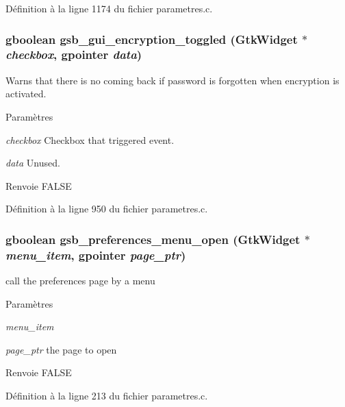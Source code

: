 Définition à la ligne 1174 du fichier parametres.c.

\subsubsection[{gsb\_\-gui\_\-encryption\_\-toggled}]{\setlength{\rightskip}{0pt plus 5cm}gboolean gsb\_\-gui\_\-encryption\_\-toggled (GtkWidget $\ast$ {\em checkbox}, \/  gpointer {\em data})}\label{parametres_8c_aeda2d150b221e3ecad4af85050194e3f}
Warns that there is no coming back if password is forgotten when encryption is activated.


\begin{DoxyParams}{Paramètres}
\item[{\em checkbox}]Checkbox that triggered event. \item[{\em data}]Unused.\end{DoxyParams}
\begin{DoxyReturn}{Renvoie}
FALSE 
\end{DoxyReturn}


Définition à la ligne 950 du fichier parametres.c.

\subsubsection[{gsb\_\-preferences\_\-menu\_\-open}]{\setlength{\rightskip}{0pt plus 5cm}gboolean gsb\_\-preferences\_\-menu\_\-open (GtkWidget $\ast$ {\em menu\_\-item}, \/  gpointer {\em page\_\-ptr})}\label{parametres_8c_a0da746576e2617f919aa2c8047ec3bf0}
call the preferences page by a menu


\begin{DoxyParams}{Paramètres}
\item[{\em menu\_\-item}]\item[{\em page\_\-ptr}]the page to open\end{DoxyParams}
\begin{DoxyReturn}{Renvoie}
FALSE 
\end{DoxyReturn}


Définition à la ligne 213 du fichier parametres.c.

